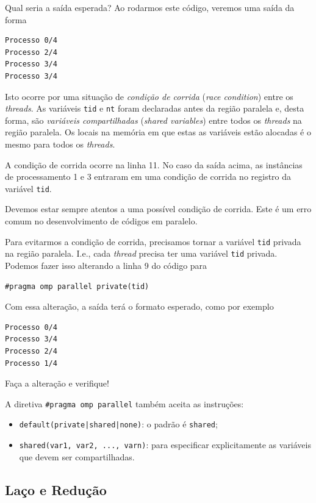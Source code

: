 Qual seria a saída esperada? Ao rodarmos este código, veremos uma saída da forma
\begin{verbatim}
Processo 0/4
Processo 2/4
Processo 3/4
Processo 3/4
\end{verbatim}
Isto ocorre por uma situação de \emph{condição de corrida} (\emph{race condition}) entre os {\it threads}. As variáveis \verb+tid+ e \verb+nt+ foram declaradas antes da região paralela e, desta forma, são \emph{variáveis compartilhadas} (\emph{shared variables}) entre todos os {\it threads} na região paralela. Os locais na memória em que estas as variáveis estão alocadas é o mesmo para todos os {\it threads}.

A condição de corrida ocorre na linha 11. No caso da saída acima, as instâncias de processamento 1 e 3 entraram em uma condição de corrida no registro da variável \verb+tid+.

\begin{obs}
  Devemos estar sempre atentos a uma possível condição de corrida. Este é um erro comum no desenvolvimento de códigos em paralelo.
\end{obs}

Para evitarmos a condição de corrida, precisamos tornar a variável \verb+tid+ privada na região paralela. I.e., cada {\it thread} precisa ter uma variável \verb+tid+ privada. Podemos fazer isso alterando a linha 9 do código para
\begin{verbatim}
#pragma omp parallel private(tid)
\end{verbatim}
Com essa alteração, a saída terá o formato esperado, como por exemplo
\begin{verbatim}
Processo 0/4
Processo 3/4
Processo 2/4
Processo 1/4
\end{verbatim}
Faça a alteração e verifique!

\begin{obs}
  A diretiva \verb+#pragma omp parallel+ também aceita as instruções:
  \begin{itemize}
  \item \verb+default(private|shared|none)+: o padrão é \verb+shared+;
  \item \verb+shared(var1, var2, ..., varn)+: para especificar explicitamente as variáveis que devem ser compartilhadas. 
  \end{itemize}
\end{obs}

\subsection{Laço e Redução}

